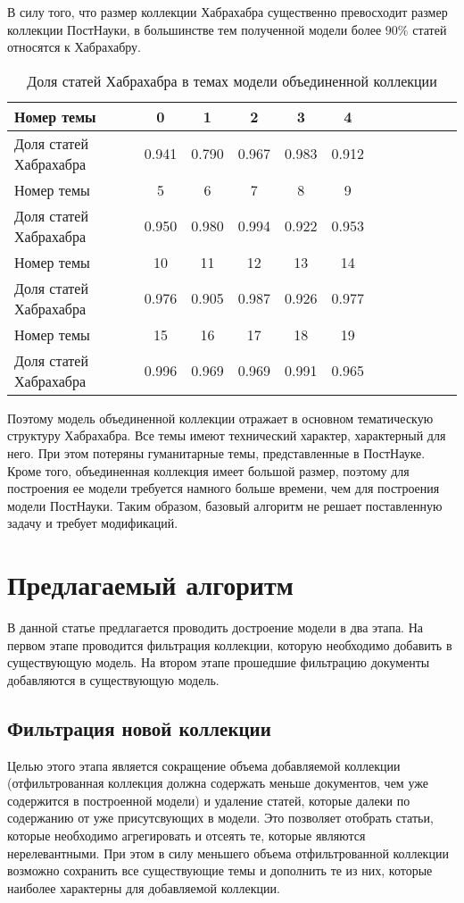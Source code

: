 В силу того, что размер коллекции Хабрахабра существенно превосходит размер коллекции ПостНауки, в большинстве тем полученной модели более $90\%$ статей относятся к Хабрахабру.

\begin{table}[h]
\centering
\caption{Доля статей Хабрахабра в темах модели объединенной коллекции}
\vspace{1ex}
\begin{tabular}{|l|*{10}{c|}r|}
\hline
Номер темы & 0 & 1 & 2 & 3 & 4   \\
\hline
Доля статей Хабрахабра & 0.941 &  0.790 & 0.967 & 0.983 & 0.912  \\
\hline
\hline
Номер темы	&5 & 6 & 7 & 8 & 9 \\
\hline
Доля статей Хабрахабра & 0.950 & 0.980& 0.994 & 0.922 &  0.953  \\
\hline
\hline
Номер темы & 10 & 11 & 12  &13 & 14\\
\hline
Доля статей Хабрахабра & 0.976 &  0.905 & 0.987 &  0.926 &  0.977  \\
\hline
\hline
Номер темы & 15 & 16 & 17  &18 & 19   \\
\hline
Доля статей Хабрахабра & 0.996 & 0.969 &  0.969  &0.991 & 0.965 \\
\hline
\end{tabular}
\end{table}

Поэтому модель объединенной коллекции отражает в основном тематическую структуру Хабрахабра. Все темы имеют технический характер, характерный для него. При этом потеряны гуманитарные темы, представленные в ПостНауке.
Кроме того, объединенная коллекция имеет большой размер, поэтому для построения ее модели требуется намного больше времени, чем для построения модели ПостНауки.
Таким образом, базовый алгоритм не решает поставленную задачу и требует модификаций.
\section{Предлагаемый алгоритм}

В данной статье предлагается проводить достроение модели в два этапа.
На первом этапе проводится фильтрация коллекции, которую необходимо добавить в существующую модель. На втором этапе прошедшие фильтрацию документы добавляются в существующую модель.

\subsection{Фильтрация новой коллекции}
Целью этого этапа является сокращение объема добавляемой коллекции (отфильтрованная коллекция должна содержать меньше документов, чем уже содержится в построенной модели) и удаление статей, которые далеки по содержанию от уже присутсвующих в модели. Это позволяет отобрать статьи, которые необходимо агрегировать и отсеять те, которые являются нерелевантными. При этом в силу меньшего объема отфильтрованной коллекции
возможно сохранить все существующие темы и дополнить те из них, которые наиболее характерны для добавляемой коллекции.

